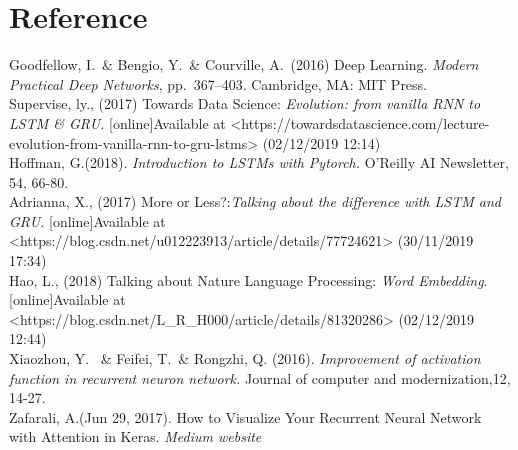 \documentclass{article}
\begin{document}
\section*{Reference}
\small

\noindent [1] Goodfellow, I.\ \& Bengio, Y.\ \& Courville, A.\ (2016) Deep Learning. {\it Modern Practical Deep Networks},
pp.\ 367--403. Cambridge, MA: MIT Press.\\

\noindent[2] Supervise, ly., (2017) Towards Data Science:
{\it Evolution: from vanilla RNN to LSTM \& GRU.} [online]Available at <https://towardsdatascience.com/lecture-evolution-from-vanilla-rnn-to-gru-lstms> (02/12/2019 12:14)\\

\noindent[3] Hoffman, G.(2018). {\it Introduction to LSTMs with Pytorch.} O'Reilly AI Newsletter, 54, 66-80.\\

\noindent[4] Adrianna, X., (2017) More or Less?:{\it Talking about the difference with LSTM and GRU.}
[online]Available at <https://blog.csdn.net/u012223913/article/details/77724621> (30/11/2019 17:34)\\

\noindent[5]  Hao, L., (2018) Talking about Nature Language Processing: {\it
Word Embedding}. [online]Available at <https://blog.csdn.net/L\_R\_H000/article/details/81320286> (02/12/2019 12:44)\\

\noindent[6]  Xiaozhou, Y. \ \& Feifei, T.\ \& Rongzhi, Q. (2016). {\it Improvement of activation function in recurrent neuron network.} Journal of computer and modernization,12, 14-27.\\

\noindent[7] Zafarali, A.(Jun 29, 2017). How to Visualize Your Recurrent Neural Network with Attention in Keras. {\it Medium website}
\end{document}
